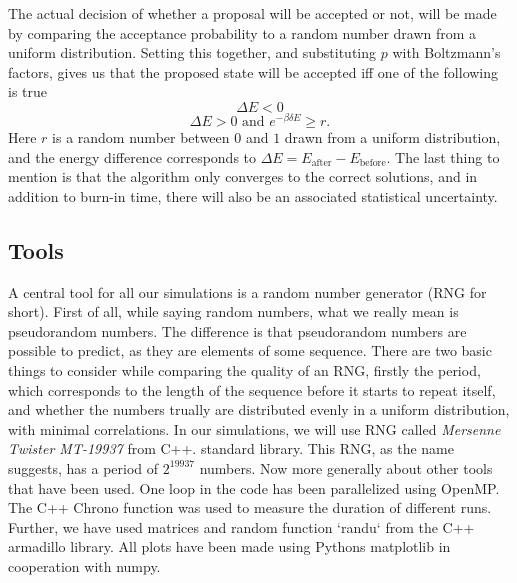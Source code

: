 \documentclass[english,notitlepage,reprint,nofootinbib]{revtex4-1}  %
\begin{document}
The actual decision of whether a proposal will be accepted or not, will be made by comparing the acceptance probability to a random number drawn from a uniform distribution. Setting this together, and substituting $p$ with Boltzmann's factors, gives us that the proposed state will be accepted iff one of the following is true
\begin{equation}
    \Delta E < 0
\end{equation}
\begin{equation}
    \Delta E > 0 \text{ and } e^{-\beta \delta E} \geq r.
\end{equation}
Here $r$ is a random number between $0$ and $1$ drawn from a uniform distribution, and the energy difference corresponds to $\Delta E = E_{\text{after}} - E_{\text{before}}$. The last thing to mention is that the algorithm only converges to the correct solutions, and in addition to burn-in time, there will also be an associated statistical uncertainty.









\subsection{Tools}
A central tool for all our simulations is a random number generator (RNG for short). First of all, while saying random numbers, what we really mean is pseudorandom numbers. The difference is that pseudorandom numbers are possible to predict, as they are elements of some sequence. There are two basic things to consider while comparing the quality of an RNG, firstly the period, which corresponds to the length of the sequence before it starts to repeat itself, and whether the numbers trually are distributed evenly in a uniform distribution, with minimal correlations. In our simulations, we will use RNG called \textit{Mersenne Twister MT-19937} from C++. standard library. This RNG, as the name suggests, has a period of $2^{19937}$ numbers.
Now more generally about other tools that have been used. One loop in the code has been parallelized using OpenMP. The C++ Chrono function was used to measure the duration of different runs. Further, we have used matrices and random function `randu` from the C++ armadillo library. All plots have been made using Pythons matplotlib in cooperation with numpy.
\end{document}
